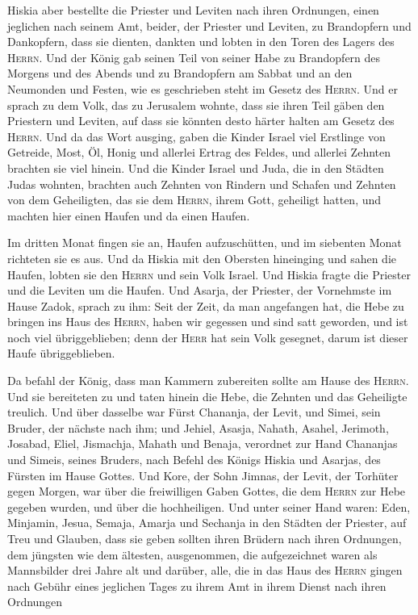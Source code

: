  Hiskia aber bestellte die Priester und Leviten nach ihren
Ordnungen, einen jeglichen nach seinem Amt, beider, der Priester und
Leviten, zu Brandopfern und Dankopfern, dass sie dienten, dankten und
lobten in den Toren des Lagers des \textsc{Herrn}.  Und
der König gab seinen Teil von seiner Habe zu Brandopfern des Morgens und
des Abends und zu Brandopfern am Sabbat und an den Neumonden und Festen,
wie es geschrieben steht im Gesetz des \textsc{Herrn}. 
Und er sprach zu dem Volk, das zu Jerusalem wohnte, dass sie ihren Teil
gäben den Priestern und Leviten, auf dass sie könnten desto härter
halten am Gesetz des \textsc{Herrn}.  Und da das Wort
ausging, gaben die Kinder Israel viel Erstlinge von Getreide, Most, Öl,
Honig und allerlei Ertrag des Feldes, und allerlei Zehnten brachten sie
viel hinein.  Und die Kinder Israel und Juda, die in den
Städten Judas wohnten, brachten auch Zehnten von Rindern und Schafen und
Zehnten von dem Geheiligten, das sie dem \textsc{Herrn}, ihrem Gott,
geheiligt hatten, und machten hier einen Haufen und da einen Haufen.

 Im dritten Monat fingen sie an, Haufen aufzuschütten, und
im siebenten Monat richteten sie es aus.  Und da Hiskia
mit den Obersten hineinging und sahen die Haufen, lobten sie den
\textsc{Herrn} und sein Volk Israel.  Und Hiskia fragte
die Priester und die Leviten um die Haufen.  Und Asarja,
der Priester, der Vornehmste im Hause Zadok, sprach zu ihm: Seit der
Zeit, da man angefangen hat, die Hebe zu bringen ins Haus des
\textsc{Herrn}, haben wir gegessen und sind satt geworden, und ist noch
viel übriggeblieben; denn der \textsc{Herr} hat sein Volk gesegnet,
darum ist dieser Haufe übriggeblieben.

 Da befahl der König, dass man Kammern zubereiten sollte
am Hause des \textsc{Herrn}. Und sie bereiteten zu  und
taten hinein die Hebe, die Zehnten und das Geheiligte treulich. Und über
dasselbe war Fürst Chananja, der Levit, und Simei, sein Bruder, der
nächste nach ihm;  und Jehiel, Asasja, Nahath, Asahel,
Jerimoth, Josabad, Eliel, Jismachja, Mahath und Benaja, verordnet zur
Hand Chananjas und Simeis, seines Bruders, nach Befehl des Königs Hiskia
und Asarjas, des Fürsten im Hause Gottes.  Und Kore, der
Sohn Jimnas, der Levit, der Torhüter gegen Morgen, war über die
freiwilligen Gaben Gottes, die dem \textsc{Herrn} zur Hebe gegeben
wurden, und über die hochheiligen.  Und unter seiner Hand
waren: Eden, Minjamin, Jesua, Semaja, Amarja und Sechanja in den Städten
der Priester, auf Treu und Glauben, dass sie geben sollten ihren Brüdern
nach ihren Ordnungen, dem jüngsten wie dem ältesten, 
ausgenommen, die aufgezeichnet waren als Mannsbilder drei Jahre alt und
darüber, alle, die in das Haus des \textsc{Herrn} gingen nach Gebühr
eines jeglichen Tages zu ihrem Amt in ihrem Dienst nach ihren Ordnungen

